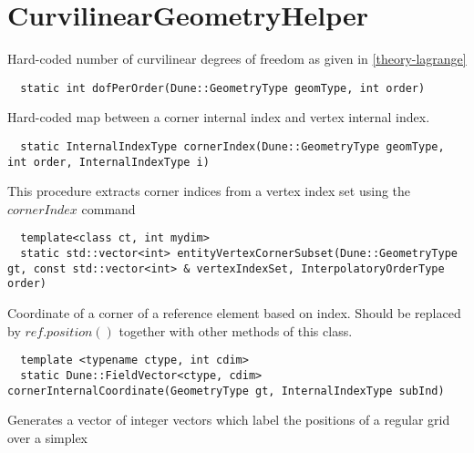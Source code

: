 \section{CurvilinearGeometryHelper}
\label{interface-geometry-helper}


\noindent
Hard-coded number of curvilinear degrees of freedom as given in \ref{theory-lagrange} \\

\begin{mybox}
\begin{lstlisting}
  static int dofPerOrder(Dune::GeometryType geomType, int order)
\end{lstlisting}
\end{mybox}

\noindent
Hard-coded map between a corner internal index and vertex internal index. \\

\begin{mybox}
\begin{lstlisting}
  static InternalIndexType cornerIndex(Dune::GeometryType geomType, int order, InternalIndexType i)
\end{lstlisting}
\end{mybox}

\noindent
This procedure extracts corner indices from a vertex index set using the $cornerIndex$ command \\

\begin{mybox}
\begin{lstlisting}
  template<class ct, int mydim>
  static std::vector<int> entityVertexCornerSubset(Dune::GeometryType gt, const std::vector<int> & vertexIndexSet, InterpolatoryOrderType order)
\end{lstlisting}
\end{mybox}

\noindent
Coordinate of a corner of a reference element based on index. Should be replaced by $ref.position()$ together with other methods of this class. \\

\begin{mybox}
\begin{lstlisting}
  template <typename ctype, int cdim>
  static Dune::FieldVector<ctype, cdim> cornerInternalCoordinate(GeometryType gt, InternalIndexType subInd)
\end{lstlisting}
\end{mybox}

\noindent
Generates a vector of integer vectors which label the positions of a regular grid over a simplex \\

